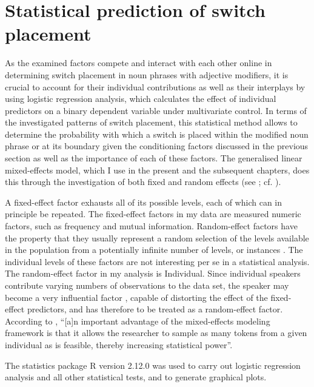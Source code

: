 \section{Statistical prediction of switch placement}\label{4:stat}

As the examined factors compete and interact with each other online in determining switch placement in noun phrases with adjective modifiers, it is crucial to account for their individual contributions as well as their interplays by using logistic regression analysis, which calculates the effect of individual predictors on a binary dependent variable under multivariate control. In terms of the investigated patterns of switch placement, this statistical method allows to determine the probability with which a switch is placed within the modified noun phrase or at its boundary given the conditioning factors discussed in the previous section as well as the importance of each of these factors. The generalised linear mixed-effects model, which I use in the present and the subsequent chapters, does this through the investigation of both fixed and random effects (see \citealt[278--84]{baayen-analyzing}; cf. \citealt{bresnan-etal}).

A fixed-effect factor exhausts all of its possible levels, each of which can in principle be repeated. The fixed-effect factors in my data are measured numeric factors, such as frequency and mutual information. Random-effect factors have the property that they usually represent a random selection of the levels available in the population from a potentially infinite number of levels, or instances \citep[][241]{baayen-analyzing}. The individual levels of these factors are not interesting per se in a statistical analysis. The random-effect factor in my analysis is Individual. Since individual speakers contribute varying numbers of observations to the data set, the speaker may become a very influential factor \citep[][]{tagliamonte-baayen-2012}, capable of distorting the effect of the fixed-effect predictors, and has therefore to be treated as a random-effect factor. According to \citet[158]{tagliamonte-baayen-2012}, ``[a]n important advantage of the mixed-effects modeling framework is that it allows the researcher to sample as many tokens from a given individual as is feasible, thereby increasing statistical power''. 

The statistics package R version 2.12.0 \citep{r} was used to carry out logistic regression analysis and all other statistical tests, and to generate graphical plots.

